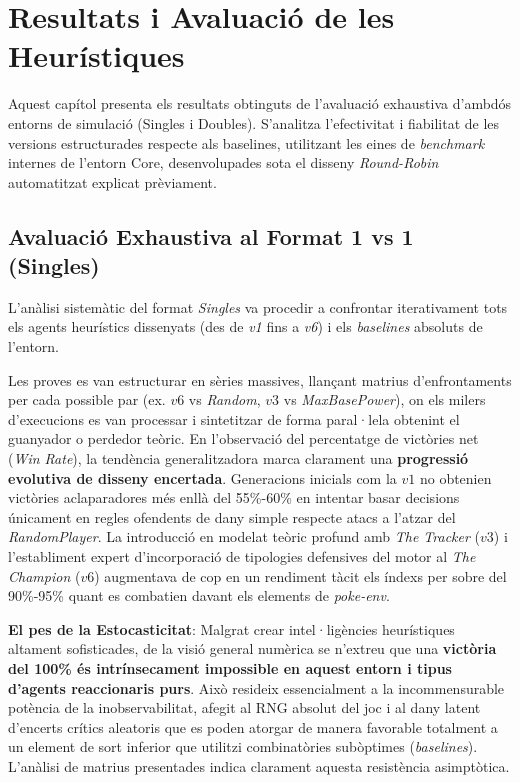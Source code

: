 \chapter{Resultats i Avaluació de les Heurístiques}
\label{chap:resultats}

Aquest capítol presenta els resultats obtinguts de l'avaluació exhaustiva d'ambdós entorns de simulació (Singles i Doubles). S'analitza l'efectivitat i fiabilitat de les versions estructurades respecte als baselines, utilitzant les eines de \textit{benchmark} internes de l'entorn Core, desenvolupades sota el disseny \textit{Round-Robin} automatitzat explicat prèviament.

\section{Avaluació Exhaustiva al Format 1 vs 1 (Singles)}

L'anàlisi sistemàtic del format \textit{Singles} va procedir a confrontar iterativament tots els agents heurístics dissenyats (des de \textit{v1} fins a \textit{v6}) i els \textit{baselines} absoluts de l'entorn.

Les proves es van estructurar en sèries massives, llançant matrius d'enfrontaments per cada possible par (ex. $v6$ vs \textit{Random}, $v3$ vs \textit{MaxBasePower}), on els milers d'execucions es van processar i sintetitzar de forma paral·lela obtenint el guanyador o perdedor teòric. En l'observació del percentatge de victòries net (\textit{Win Rate}), la tendència generalitzadora marca clarament una \textbf{progressió evolutiva de disseny encertada}. 
Generacions inicials com la $v1$ no obtenien victòries aclaparadores més enllà del 55\%-60\% en intentar basar decisions únicament en regles ofendents de dany simple respecte atacs a l'atzar del \textit{RandomPlayer}. La introducció en modelat teòric profund amb \textit{The Tracker} ($v3$) i l'establiment expert d'incorporació de tipologies defensives del motor al \textit{The Champion} ($v6$) augmentava de cop en un rendiment tàcit els índexs per sobre del 90\%-95\% quant es combatien davant els elements de \textit{poke-env}.

\textbf{El pes de la Estocasticitat}: Malgrat crear intel·ligències heurístiques altament sofisticades, de la visió general numèrica se n'extreu que una \textbf{victòria del 100\% és intrínsecament impossible en aquest entorn i tipus d'agents reaccionaris purs}. Això resideix essencialment a la incommensurable potència de la inobservabilitat, afegit al RNG absolut del joc i al dany latent d'encerts crítics aleatoris que es poden atorgar de manera favorable totalment a un element de sort inferior que utilitzi combinatòries subòptimes (\textit{baselines}). L'anàlisi de matrius presentades indica clarament aquesta resistència asimptòtica.

